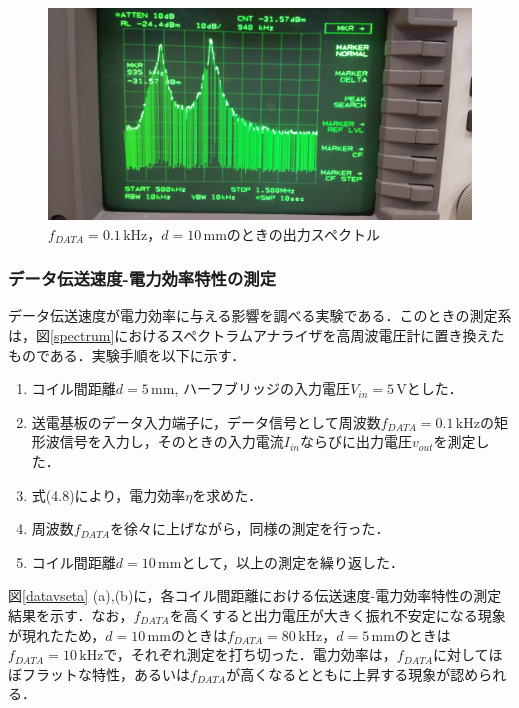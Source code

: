 \begin{figure}[p]
\begin{center}
  \includegraphics[width=160mm]{figures/spectrumimage.jpg}
  \caption{ $f_{DATA}=0.1 \, \mathrm{kHz}$，$d=10 \, \mathrm{mm}$のときの出力スペクトル}
  \label{spectrumimage}
  
  \end{center}
\end{figure}


\subsubsection{データ伝送速度-電力効率特性の測定}
データ伝送速度が電力効率に与える影響を調べる実験である．このときの測定系は，図\ref{spectrum}におけるスペクトラムアナライザを高周波電圧計に置き換えたものである．実験手順を以下に示す．

\begin{enumerate} \setlength{\itemsep}{-0.2cm}
  \item コイル間距離$d =5 \, \mathrm{mm}$, ハーフブリッジの入力電圧$V_{in}=5 \, \mathrm{V}$とした．
  \item 送電基板のデータ入力端子に，データ信号として周波数$f_{DATA}=0.1 \, \mathrm{kHz}$の矩形波信号を入力し，そのときの入力電流$I_{in}$ならびに出力電圧$v_{out}$を測定した．
  \item 式(4.8)により，電力効率$\eta$を求めた．
  \item 周波数$f_{DATA}$を徐々に上げながら，同様の測定を行った．
  \item コイル間距離$d =10 \, \mathrm{mm}$として，以上の測定を繰り返した．
\end{enumerate}
図\ref{datavseta} (a),(b)に，各コイル間距離における伝送速度-電力効率特性の測定結果を示す．なお，$f_{DATA}$を高くすると出力電圧が大きく振れ不安定になる現象が現れたため，$d =10 \, \mathrm{mm}$のときは$f_{DATA}=80 \, \mathrm{kHz}$，$d =5 \, \mathrm{mm}$のときは$f_{DATA}=10 \, \mathrm{kHz}$で，それぞれ測定を打ち切った．電力効率は，$f_{DATA}$に対してほぼフラットな特性，あるいは$f_{DATA}$が高くなるとともに上昇する現象が認められる．


